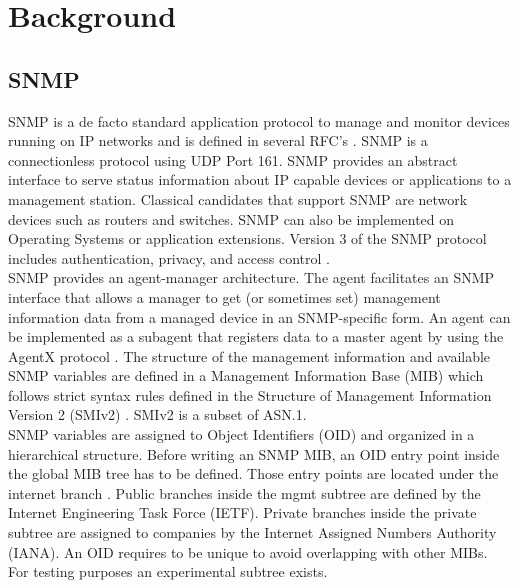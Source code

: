 \section{Background}
\label{chap:background}
\subsection{SNMP}
SNMP is a de facto standard application protocol to manage and monitor devices running on IP networks and is defined in several RFC's \cite{snmp-rfc}. SNMP is a connectionless protocol using UDP Port 161. SNMP provides an abstract interface to serve status information about IP capable devices or applications to a management station. Classical candidates that support SNMP are network devices such as routers and switches. SNMP can also be implemented on Operating Systems or application extensions. Version 3 of the SNMP protocol includes authentication, privacy, and access control \cite{cisco-snmp}.  
\\
SNMP provides an agent-manager architecture. The agent facilitates an SNMP interface that allows a manager to get (or sometimes set) management information data from a managed device in an SNMP-specific form. An agent can be implemented as a subagent that registers data to a master agent by using the AgentX protocol \cite{agentx}. The structure of the management information and available SNMP variables are defined in a Management Information Base (MIB) which follows strict syntax rules defined in the Structure of Management Information Version 2 (SMIv2) \cite{smiv2}. SMIv2 is a subset of ASN.1. 
\\
SNMP variables are assigned to Object Identifiers (OID) and organized in a hierarchical structure. Before writing an SNMP MIB, an OID entry point inside the global MIB tree has to be defined. Those entry points are located under the internet branch \cite{oid1}. Public branches  inside the mgmt subtree are defined by the Internet Engineering Task Force (IETF). Private branches inside the private subtree are assigned to companies by the Internet Assigned Numbers Authority (IANA). An OID requires to be unique to avoid overlapping with other MIBs. For testing purposes an experimental subtree exists. 

